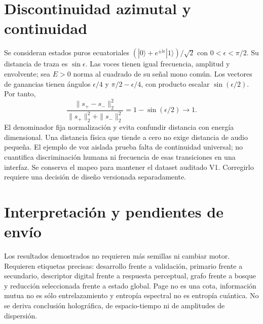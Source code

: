 \documentclass[11pt,a4paper]{article}
\begin{document}
\section{Discontinuidad azimutal y continuidad}
Se consideran estados puros ecuatoriales $(|0\rangle+e^{\pm\mathrm i\epsilon}|1\rangle)/\sqrt2$ con $0<\epsilon<\pi/2$. Su distancia de traza es $\sin\epsilon$. Las voces tienen igual frecuencia, amplitud y envolvente; sea $E>0$ norma al cuadrado de su señal mono común. Los vectores de ganancias tienen ángulos $\epsilon/4$ y $\pi/2-\epsilon/4$, con producto escalar $\sin(\epsilon/2)$. Por tanto,
\[
\frac{\|s_+-s_-\|_2^2}{\|s_+\|_2^2+\|s_-\|_2^2}=1-\sin(\epsilon/2)\longrightarrow1.
\]
El denominador fija normalización y evita confundir distancia con energía dimensional. Una distancia física que tiende a cero no exige distancia de audio pequeña. El ejemplo de voz aislada prueba falta de continuidad universal; no cuantifica discriminación humana ni frecuencia de esas transiciones en una interfaz. Se conserva el mapeo para mantener el dataset auditado V1. Corregirlo requiere una decisión de diseño versionada separadamente.

\section{Interpretación y pendientes de envío}
Los resultados demostrados no requieren más semillas ni cambiar motor. Requieren etiquetas precisas: desarrollo frente a validación, primario frente a secundario, descriptor digital frente a respuesta perceptual, grafo frente a bosque y reducción seleccionada frente a estado global. Page no es una cota, información mutua no es sólo entrelazamiento y entropía espectral no es entropía cuántica. No se deriva conclusión holográfica, de espacio-tiempo ni de amplitudes de dispersión.
\end{document}
